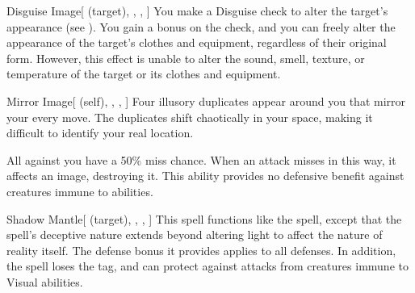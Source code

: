 \lowercase{\hypertarget{spell:Disguise Image}{}}\label{spell:Disguise Image}
\begin{attuneability}[Rank 3]{\hypertarget{spell:Disguise Image}{Disguise Image}}[ (target), , , ]
You make a Disguise check to alter the target's appearance (see ).
You gain a  bonus on the check, and you can freely alter the appearance of the target's clothes and equipment, regardless of their original form.
However, this effect is unable to alter the sound, smell, texture, or temperature of the target or its clothes and equipment.
\end{attuneability}
\vspace{0.25em}



\lowercase{\hypertarget{spell:Mirror Image}{}}\label{spell:Mirror Image}
\begin{attuneability}[Rank 3]{\hypertarget{spell:Mirror Image}{Mirror Image}}[ (self), , , ]
Four illusory duplicates appear around you that mirror your every move.
The duplicates shift chaotically in your space, making it difficult to identify your real location.

All   against you have a 50\% miss chance.
When an attack misses in this way, it affects an image, destroying it.
This ability provides no defensive benefit against creatures immune to  abilities.
\end{attuneability}
\vspace{0.25em}



\lowercase{\hypertarget{spell:Shadow Mantle}{}}\label{spell:Shadow Mantle}
\begin{attuneability}[Rank 4]{\hypertarget{spell:Shadow Mantle}{Shadow Mantle}}[ (target), , , ]
This spell functions like the  spell, except that the spell's deceptive nature extends beyond altering light to affect the nature of reality itself.
The defense bonus it provides applies to all defenses.
In addition, the spell loses the  tag, and can protect against attacks from creatures immune to Visual abilities.
\end{attuneability}
\vspace{0.25em}



